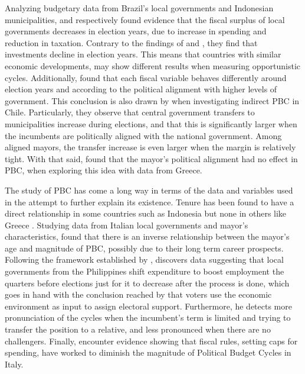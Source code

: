 Analyzing budgetary data from Brazil's local governments and Indonesian municipalities, \textcite{sarukai2010} and \textcite{setiawan2017} respectively found evidence that the fiscal surplus of local governments decreases in election years, due to increase in spending and reduction in taxation. Contrary to the findings of \textcite{veiga2007} and \textcite{drazen2010}, they find that investments decline in election years. This means that countries with similar economic developments, may show different results when measuring opportunistic cycles. Additionally, \textcite{sarukai2010} found that each fiscal variable behaves differently around election years and according to the political alignment with higher levels of government. This conclusion is also drawn by \textcite{corvalan2018} when investigating indirect PBC in Chile. Particularly, they observe that central government transfers to municipalities increase during elections, and that this is significantly larger when the incumbents are politically aligned with the national government. Among aligned mayors, the transfer increase is even larger when the margin is relatively tight. With that said, \textcite{chortareas2016} found that the mayor's political alignment had no effect in PBC, when exploring this idea with data from Greece.

The study of PBC has come a long way in terms of the data and variables used in the attempt to further explain its existence. Tenure has been found to have a direct relationship in some countries such as Indonesia \parencite{sarukai2010} but none in others like Greece \parencite{chortareas2016}. Studying data from Italian local governments and mayor's characteristics, \textcite{alesina2018} found that there is an inverse relationship between the mayor's age and magnitude of PBC, possibly due to their long term career prospects. Following the framework established by \textcite{nordhaus1975}, \textcite{labonne2016} discovers data suggesting that local governments from the Philippines shift expenditure to boost employment the quarters before elections just for it to decrease after the process is done, which goes in hand with the conclusion reached by \textcite{alfaro2019} that voters use the economic environment as input to assign electoral support. Furthermore, he detects more pronunciation of the cycles when the incumbent’s term is limited and trying to transfer the position to a relative, and less pronounced when there are no challengers. Finally, \textcite{bonfatti2019} encounter evidence showing that fiscal rules, setting caps for spending, have worked to diminish the magnitude of Political Budget Cycles in Italy.

